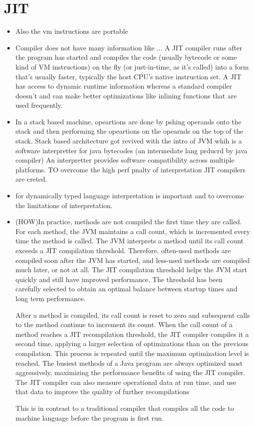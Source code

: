 \documentclass[10pt,oneside]{report}
\begin{document}
\chapter{JIT}

\begin{itemize}
\item
Also the vm instructions are portable
\item
Compiler does not have many information like ...
A JIT compiler runs after the program has started and compiles the code
(usually bytecode or some kind of VM instructions) on the fly (or just-in-time,
    as it's called) into a form that's usually faster, typically the host CPU's
native instruction set. A JIT has access to dynamic runtime information whereas
a standard compiler doesn't and can make better optimizations like inlining
functions that are used frequently.

\item In a stack based machine, opeartions are done by pshing operands onto the stack and then performing the opeartions 
on the opearnds on the top of the stack. Stack based architecture got revived with the intro of
JVM whih is a software interpretter for java bytecodes (an intermedate lang prducrd by java compiler)
An interpretter provides software compatibility across multiple 
platforms. TO overcome the high perf pnalty of interpretation JIT compilers are creted.

\item for dynamically typed language interpretation is important and to overcome 
the limitations of interpretation.

\item (HOW)In practice, methods are not compiled the first time they are called. For
each method, the JVM maintains a call count, which is incremented every time
the method is called. The JVM interprets a method until its call count exceeds
a JIT compilation threshold. Therefore, often-used methods are compiled soon
after the JVM has started, and less-used methods are compiled much later, or
not at all. The JIT compilation threshold helps the JVM start quickly and still
have improved performance. The threshold has been carefully selected to obtain
an optimal balance between startup times and long term performance.

After a method is compiled, its call count is reset to zero and subsequent
calls to the method continue to increment its count. When the call count of a
method reaches a JIT recompilation threshold, the JIT compiler compiles it a
second time, applying a larger selection of optimizations than on the previous
compilation. This process is repeated until the maximum optimization level is
reached. The busiest methods of a Java program are always optimized most
aggressively, maximizing the performance benefits of using the JIT compiler.
The JIT compiler can also measure operational data at run time, and use that
data to improve the quality of further recompilations

This is in contrast to a traditional compiler that compiles all the code to machine language before the program is first run.
\end{itemize}
\end{document}
